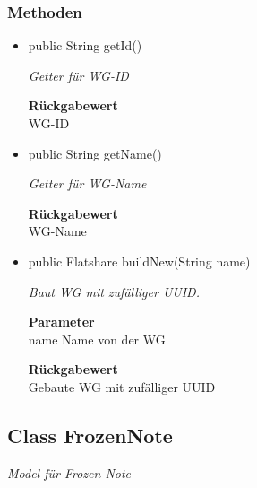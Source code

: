 \documentclass[a4paper]{scrreprt}
\begin{document}
        \subsubsection{Methoden}
        \begin{itemize}
        	\item{public String getId()}
        	
        	\textit{Getter für WG-ID}
        	
        	
        	
        	\textbf{Rückgabewert} \\
        	WG-ID        \item{public String getName()}
        	
        	\textit{Getter für WG-Name}
        	
        	
        	
        	\textbf{Rückgabewert} \\
        	WG-Name        \item{public Flatshare buildNew(String name)}
        	
        	\textit{Baut WG mit zufälliger UUID.}
        	
        	\textbf{Parameter} \\
        	name Name von der WG
        	
        	\textbf{Rückgabewert} \\
        	Gebaute WG mit zufälliger UUID
        \end{itemize}
        \subsection{Class FrozenNote}
        \textit{Model für Frozen Note}
\end{document}
